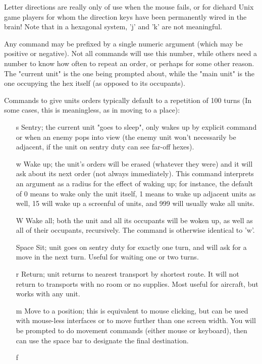 Letter directions are really only of use when the mouse fails, or for diehard
Unix game players for whom the direction keys have been permanently wired
in the brain!  Note that in a hexagonal system, 'j' and 'k' are not
meaningful.
\par\noindent
Any command may be prefixed by a single numeric argument (which may be
positive or negative).
Not all commands will
use this number, while others need a number to know how often to repeat
an order, or perhaps for some other reason.
The "current unit" is the one
being prompted about, while the "main unit" is the one occupying the
hex itself (as opposed to its occupants).
\par\noindent
Commands to give units orders typically default to a repetition of 100 turns
(In some cases, this is meaningless, as in moving to a place):
\begin{itemize}
\item[{s}]
Sentry; the current unit "goes to sleep",
only wakes up by explicit command or when an enemy pops into view
(the enemy unit won't necessarily be adjacent, if the unit on sentry
duty can see far-off hexes).
\item[{w}]
Wake up; the unit's orders will be erased
(whatever they were) and it will ask about its next order (not
always immediately).  This command interprets an argument as a radius for
the effect of waking up; for instance, the default of 0 means to wake only
the unit itself, 1 means to wake up adjacent units as well,
15 will wake up a screenful of units, and 999 will usually wake all units.
\item[{W}]
Wake all; both the unit and all its occupants will be woken up, as
well as all of their occupants, recursively.
The command is otherwise identical to 'w'.
\item[{Space}]
Sit; unit goes on sentry duty for exactly one turn, and will ask for
a move in the next turn.  Useful for waiting one or two turns.
\item[{r}]
Return; unit returns to nearest transport by shortest route.
It will not return to transports with no room or no supplies.
Most useful for aircraft, but works with any unit.
\item[{m}]
Move to a position; this is equivalent to mouse clicking, but can be used
with mouse-less interfaces or to move further than one screen width.  You will
be prompted to do movement commands (either mouse or keyboard), then can use
the space bar to designate the final destination.
\item[{f}]

\end{itemize}
